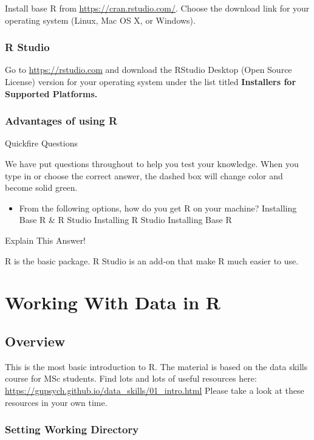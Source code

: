 \documentclass[]{book}
\providecommand{\tightlist}{%
  \setlength{\itemsep}{0pt}\setlength{\parskip}{0pt}}
\begin{document}
Install base R from \url{https://cran.rstudio.com/}. Choose the download
link for your operating system (Linux, Mac OS X, or Windows).

\subsection{R Studio}\label{r-studio}

Go to \url{https://rstudio.com} and download the RStudio Desktop (Open
Source License) version for your operating system under the list titled
\textbf{Installers for Supported Platforms.}

\subsection{Advantages of using R}\label{advantages-of-using-r}

{Quickfire Questions}

We have put questions throughout to help you test your knowledge. When
you type in or choose the correct answer, the dashed box will change
color and become solid green.

\begin{itemize}
\tightlist
\item
  From the following options, how do you get R on your machine?
  Installing Base R \& R Studio Installing R Studio Installing Base R
\end{itemize}

Explain This Answer!

R is the basic package. R Studio is an add-on that make R much easier to
use.

\chapter{Working With Data in R}\label{working-with-data-in-r}

\section{Overview}\label{overview-2}

This is the most basic introduction to R. The material is based on the
data skills course for MSc students. Find lots and lots of useful
resources here:
\url{https://gupsych.github.io/data_skills/01_intro.html} Please take a
look at these resources in your own time.

\subsection{Setting Working Directory}\label{setting-working-directory}
\end{document}
